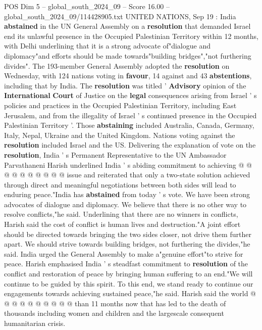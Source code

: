\begin{textsample}{POS Dim 5 – global\_south\_2024\_09 – Score 16.00 – global\_south\_2024\_09/114428905.txt}  \label{ex:f5_pos_233}
UNITED NATIONS, Sep 19 : India \textbf{abstained} in the UN General Assembly on a \textbf{resolution} that demanded Israel end its unlawful presence in the Occupied Palestinian Territory within 12 months, with Delhi underlining that it is a strong advocate of"dialogue and diplomacy"and efforts should be made towards"building bridges","not furthering divides".
The 193-member General Assembly adopted the \textbf{resolution} on Wednesday, with 124 nations voting in \textbf{favour}, 14 against and 43 \textbf{abstentions}, including that by India.
The \textbf{resolution} was titled ' \textbf{Advisory} opinion of the \textbf{International} \textbf{Court} of Justice on the \textbf{legal} consequences arising from Israel ' s policies and practices in the Occupied Palestinian Territory, including East Jerusalem, and from the illegality of Israel ' s continued presence in the Occupied Palestinian Territory '.
Those \textbf{abstaining} included Australia, Canada, Germany, Italy, Nepal, Ukraine and the United Kingdom.
Nations voting against the \textbf{resolution} included Israel and the US.
Delivering the explanation of vote on the \textbf{resolution}, India ' s Permanent Representative to the UN Ambassador Parvathaneni Harish underlined India ' s abiding commitment to achieving @ @ @ @ @ @ @ @ @ @ issue and reiterated that only a two-state solution achieved through direct and meaningful negotiations between both sides will lead to enduring peace."India has \textbf{abstained} from today ' s vote.
We have been strong advocates of dialogue and diplomacy.
We believe that there is no other way to resolve conflicts,"he said.
Underlining that there are no winners in conflicts, Harish said the cost of conflict is human lives and destruction."A joint effort should be directed towards bringing the two sides closer, not drive them further apart.
We should strive towards building bridges, not furthering the divides,"he said.
India urged the General Assembly to make a"genuine effort"to strive for peace.
Harish emphasised India ' s steadfast commitment to \textbf{resolution} of the conflict and restoration of peace by bringing human suffering to an end."We will continue to be guided by this spirit.
To this end, we stand ready to continue our engagements towards achieving sustained peace,"he said.
Harish said the world @ @ @ @ @ @ @ @ @ @ than 11 months now that has led to the death of thousands including women and children and the largescale consequent humanitarian crisis.

\end{textsample}
